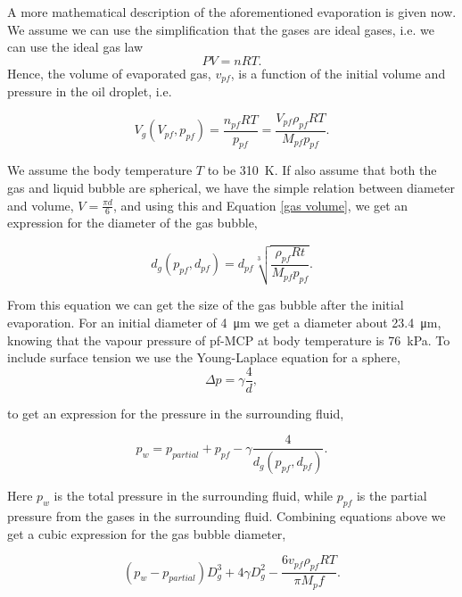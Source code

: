A more mathematical description of the aforementioned evaporation is given now\cite{Healey2013}. We assume we can use the simplification that the gases are ideal gases, i.e. we can use the ideal gas law
\begin{equation}
\label{ideal gas law}
 PV = nRT. 
\end{equation}  
Hence, the volume of evaporated gas, $v_{pf}$, is a function of the initial volume and pressure in the oil droplet, i.e.

\begin{equation}
\label{gas volume}
V_g(V_{pf}, p_{pf}) = \frac{n_{pf}RT}{p_{pf}}=\frac{V_{pf}\rho_{pf}RT}{M_{pf}p_{pf}}.
\end{equation}

We assume the body temperature $T$ to be \SI{310}{\kelvin}. If also assume that both the gas and liquid bubble are spherical, we have the simple relation between diameter and volume, $V = \frac{\pi d}{6}$, and using this and Equation \eqref{gas volume}, we get an expression for the diameter of the gas bubble, 

\begin{equation}
\label{diameter}
d_g(p_{pf}, d_{pf}) = d_{pf}\sqrt[3]{\frac{\rho_{pf}Rt}{M_{pf}p_{pf}}}.
\end{equation}

From this equation we can get the size of the gas bubble after the initial evaporation. For an initial diameter of \SI{4}{\micro\metre} we get a diameter about \SI{23.4}{\micro\metre}, knowing that the vapour pressure of pf-MCP at body temperature is \SI{76}{\kilo\pascal}\cite{Healey2013}.
To include surface tension we use the Young-Laplace equation for a sphere,
\begin{equation}
\label{Young-Laplace}
\Delta p = \gamma\frac{4}{d},
\end{equation}

to get an expression for the pressure in the surrounding fluid, 

\begin{equation}
p_w = p_{partial} + p_{pf} - \gamma \frac{4}{d_g(p_{pf}\mathrm{, } d_{pf})}.
\end{equation}

Here $p_w$ is the total pressure in the surrounding fluid, while $p_{pf}$ is the partial pressure from the gases in the surrounding fluid. Combining equations above we get a cubic expression for the gas bubble diameter,  

\begin{equation}
\label{cubic}
(p_w-p_{partial})D_g^3 + 4\gamma D_g^2 - \frac{6v_{pf}\rho_{pf}RT}{\pi M_pf}.
\end{equation}

